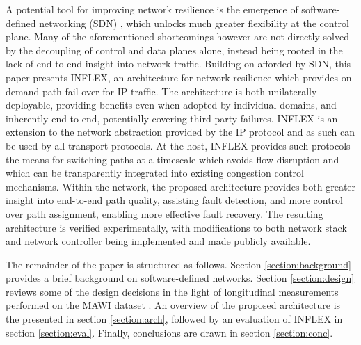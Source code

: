 A potential tool for improving network resilience is the emergence of software-defined networking (SDN) \cite{McKeown:2008:OEI:1355734.1355746}, which unlocks much greater flexibility at the control plane.
Many of the aforementioned shortcomings however are not directly solved by the decoupling of control and data planes alone, instead being rooted in the lack of end-to-end insight into network traffic.
Building on afforded by SDN, this paper presents INFLEX, an architecture for network resilience which provides on-demand path fail-over for IP traffic.
The architecture is both unilaterally deployable, providing benefits even when adopted by individual domains, and inherently end-to-end, potentially covering third party failures.
INFLEX is an extension to the network abstraction provided by the IP protocol and as such can be used by all transport protocols.
At the host, INFLEX provides such protocols the means for switching paths at a timescale which avoids flow disruption and which can be transparently integrated into existing congestion control mechanisms.
Within the network, the proposed architecture provides both greater insight into end-to-end path quality, assisting fault detection, and more control over path assignment, enabling more effective fault recovery.
The resulting architecture is verified experimentally, with modifications to both network stack and network controller being implemented and made publicly available.

The remainder of the paper is structured as follows.
Section \ref{section:background} provides a brief background on software-defined networks.
Section \ref{section:design} reviews some of the design decisions in the light of longitudinal measurements performed on the MAWI dataset \cite{MAWI}.
An overview of the proposed architecture is the presented in section \ref{section:arch}, followed by an evaluation of INFLEX in section \ref{section:eval}.
Finally, conclusions are drawn in section \ref{section:conc}.

%


